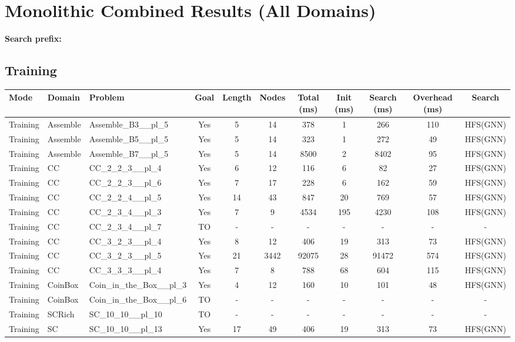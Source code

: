 \documentclass{article}
\begin{document}
\section*{Monolithic Combined Results (All Domains)}
\textbf{Search prefix:} 
\\[0.5cm]
\subsection*{Training}
\begin{tabular}{lllcccccccc}
\toprule
Mode & Domain & Problem & Goal & Length & Nodes & Total (ms) & Init (ms) & Search (ms) & Overhead (ms) & Search \\
\midrule
Training & Assemble & Assemble\_B3\_\_pl\_5 & Yes & 5 & 14 & 378 & 1 & 266 & 110 & HFS(GNN) \\
Training & Assemble & Assemble\_B5\_\_pl\_5 & Yes & 5 & 14 & 323 & 1 & 272 & 49 & HFS(GNN) \\
Training & Assemble & Assemble\_B7\_\_pl\_5 & Yes & 5 & 14 & 8500 & 2 & 8402 & 95 & HFS(GNN) \\
Training & CC & CC\_2\_2\_3\_\_pl\_4 & Yes & 6 & 12 & 116 & 6 & 82 & 27 & HFS(GNN) \\
Training & CC & CC\_2\_2\_3\_\_pl\_6 & Yes & 7 & 17 & 228 & 6 & 162 & 59 & HFS(GNN) \\
Training & CC & CC\_2\_2\_4\_\_pl\_5 & Yes & 14 & 43 & 847 & 20 & 769 & 57 & HFS(GNN) \\
Training & CC & CC\_2\_3\_4\_\_pl\_3 & Yes & 7 & 9 & 4534 & 195 & 4230 & 108 & HFS(GNN) \\
Training & CC & CC\_2\_3\_4\_\_pl\_7 & TO & - & - & - & - & - & - & - \\
Training & CC & CC\_3\_2\_3\_\_pl\_4 & Yes & 8 & 12 & 406 & 19 & 313 & 73 & HFS(GNN) \\
Training & CC & CC\_3\_2\_3\_\_pl\_5 & Yes & 21 & 3442 & 92075 & 28 & 91472 & 574 & HFS(GNN) \\
Training & CC & CC\_3\_3\_3\_\_pl\_4 & Yes & 7 & 8 & 788 & 68 & 604 & 115 & HFS(GNN) \\
Training & CoinBox & Coin\_in\_the\_Box\_\_pl\_3 & Yes & 4 & 12 & 160 & 10 & 101 & 48 & HFS(GNN) \\
Training & CoinBox & Coin\_in\_the\_Box\_\_pl\_6 & TO & - & - & - & - & - & - & - \\
Training & SCRich & SC\_10\_10\_\_pl\_10 & TO & - & - & - & - & - & - & - \\
Training & SC & SC\_10\_10\_\_pl\_13 & Yes & 17 & 49 & 406 & 19 & 313 & 73 & HFS(GNN) \\

\end{tabular}
\end{document}
